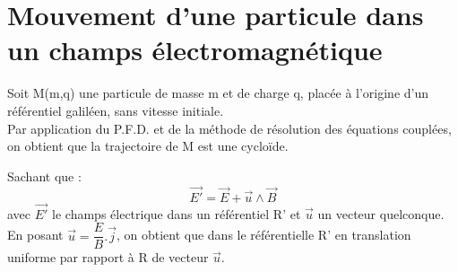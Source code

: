 \chapter{Mouvement d'une particule dans un champs électromagnétique}
\begin{prop}
Soit M(m,q) une particule de masse m et de charge q, placée à l'origine d'un référentiel galiléen, sans vitesse initiale.\\
Par application du P.F.D. et de la méthode de résolution des équations couplées, on obtient que la trajectoire de M est une cycloïde.
\end{prop}
\begin{prop}
Sachant que : 
$$\overrightarrow{E'} = \overrightarrow{E} + \overrightarrow{u}\wedge\overrightarrow{B}$$
avec $\overrightarrow{E'}$ le champs électrique dans un référentiel R' et $\overrightarrow{u}$ un vecteur quelconque.\\
En posant $\overrightarrow{u} = \dfrac{E}{B}.\overrightarrow{j}$, on obtient que dans le référentielle R' en translation uniforme par rapport à R de vecteur $\overrightarrow{u}$.
\end{prop}
